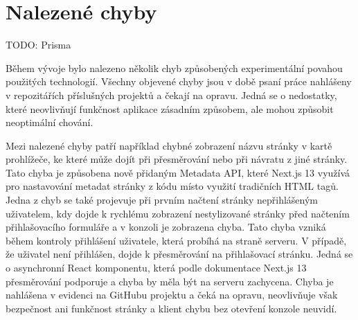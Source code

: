 \section{Nalezené chyby}

TODO: Prisma

Během vývoje bylo nalezeno několik chyb způsobených experimentální povahou použitých technologií. Všechny objevené chyby jsou v době psaní práce
nahlášeny v repozitářích příslušných projektů a čekají na opravu. Jedná se o nedostatky, které neovlivňují funkčnost aplikace zásadním způsobem, ale mohou způsobit
neoptimální chování.

Mezi nalezené chyby patří například chybné zobrazení názvu stránky v kartě prohlížeče, ke které může dojít při přesměrování nebo při 
návratu z jiné stránky. Tato chyba je způsobena nově přidaným Metadata API, které Next.js 13 využívá pro nastavování metadat stránky z kódu místo využití tradičních
HTML tagů. Jedna z chyb se také projevuje při prvním načtení stránky nepřihlášeným uživatelem, kdy dojde k rychlému zobrazení nestylizované stránky před načtením
přihlašovacího formuláře a v konzoli je zobrazena chyba. Tato chyba vzniká během kontroly přihlášení uživatele, která probíhá na straně serveru. V případě, že 
uživatel není přihlášen, dojde k přesměrování na přihlašovací stránku. Jedná se o asynchronní React komponentu, která podle dokumentace Next.js 13 přesměrování podporuje a chyba by 
měla být na serveru zachycena. Chyba je nahlášena v evidenci na GitHubu projektu a čeká na opravu, neovlivňuje však bezpečnost ani funkčnost stránky a klient
chybu bez otevření konzole neuvidí.

